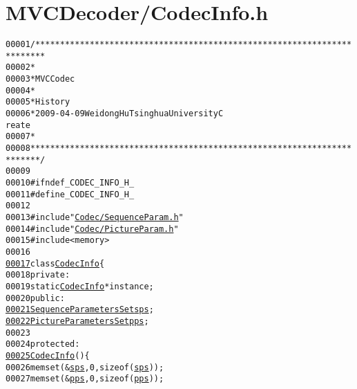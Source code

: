 \hypertarget{_codec_info_8h_source}{
\section{MVCDecoder/CodecInfo.h}
}


\begin{footnotesize}\begin{alltt}
00001 \textcolor{comment}{/************************************************************************}
00002 \textcolor{comment}{ *}
00003 \textcolor{comment}{ * MVC Codec}
00004 \textcolor{comment}{ * }
00005 \textcolor{comment}{ * History}
00006 \textcolor{comment}{ * 2009-04-09           Weidong Hu              Tsinghua University             C
      reate}
00007 \textcolor{comment}{ * }
00008 \textcolor{comment}{ ************************************************************************/}
00009 
00010 \textcolor{preprocessor}{#ifndef \_CODEC\_INFO\_H\_}
00011 \textcolor{preprocessor}{}\textcolor{preprocessor}{#define \_CODEC\_INFO\_H\_}
00012 \textcolor{preprocessor}{}
00013 \textcolor{preprocessor}{#include "\hyperlink{_sequence_param_8h}{Codec/SequenceParam.h}"}
00014 \textcolor{preprocessor}{#include "\hyperlink{_picture_param_8h}{Codec/PictureParam.h}"}
00015 \textcolor{preprocessor}{#include <memory>}
00016 
\hypertarget{_codec_info_8h_source_l00017}{}\hyperlink{class_codec_info}{00017} \textcolor{keyword}{class }\hyperlink{class_codec_info}{CodecInfo} \{
00018 \textcolor{keyword}{private}:
00019         \textcolor{keyword}{static} \hyperlink{class_codec_info}{CodecInfo} *instance;
00020 \textcolor{keyword}{public}:
\hypertarget{_codec_info_8h_source_l00021}{}\hyperlink{class_codec_info_aee785011cec77ff3c0c646b498fe1e7d}{00021}         \hyperlink{struct_sequence_parameters_set}{SequenceParametersSet} \hyperlink{class_codec_info_aee785011cec77ff3c0c646b498fe1e7d}{sps};
\hypertarget{_codec_info_8h_source_l00022}{}\hyperlink{class_codec_info_abaa8d84a7d4045129ee64d91eaac4481}{00022}         \hyperlink{struct_picture_parameters_set}{PictureParametersSet} \hyperlink{class_codec_info_abaa8d84a7d4045129ee64d91eaac4481}{pps};
00023 
00024 \textcolor{keyword}{protected}:
\hypertarget{_codec_info_8h_source_l00025}{}\hyperlink{class_codec_info_ab2ecf673aaa2480fafb0b3d22896e4b6}{00025}         \hyperlink{class_codec_info_ab2ecf673aaa2480fafb0b3d22896e4b6}{CodecInfo}() \{
00026                 memset(&\hyperlink{class_codec_info_aee785011cec77ff3c0c646b498fe1e7d}{sps}, 0, \textcolor{keyword}{sizeof}(\hyperlink{class_codec_info_aee785011cec77ff3c0c646b498fe1e7d}{sps}));
00027                 memset(&\hyperlink{class_codec_info_abaa8d84a7d4045129ee64d91eaac4481}{pps}, 0, \textcolor{keyword}{sizeof}(\hyperlink{class_codec_info_abaa8d84a7d4045129ee64d91eaac4481}{pps}));

\end{alltt}
\end{footnotesize}
